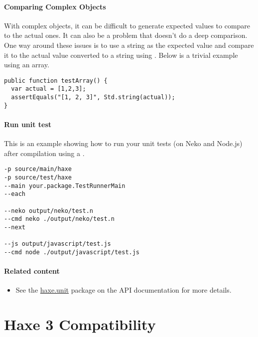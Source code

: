 
\paragraph{Comparing Complex Objects}

With complex objects, it can be difficult to generate expected values to compare to the actual ones. It can also be a problem that  doesn't do a deep comparison. One way around these issues is to use a string as the expected value and compare it to the actual value converted to a string using . Below is a trivial example using an array.

\begin{lstlisting} 
public function testArray() {
  var actual = [1,2,3];
  assertEquals("[1, 2, 3]", Std.string(actual));
}
\end{lstlisting} 

\paragraph{Run unit test}

This is an example showing how to run your unit tests (on Neko and Node.js) after compilation using a .

\begin{lstlisting} 
-p source/main/haxe
-p source/test/haxe
--main your.package.TestRunnerMain
--each

--neko output/neko/test.n
--cmd neko ./output/neko/test.n
--next

--js output/javascript/test.js
--cmd node ./output/javascript/test.js
\end{lstlisting} 

\paragraph{Related content}
\begin{itemize}
	\item See the \href{https://api.haxe.org/haxe/unit/}{haxe.unit} package on the API documentation for more details.
\end{itemize}


\section{Haxe 3 Compatibility}
\label{std-hx3compat}

